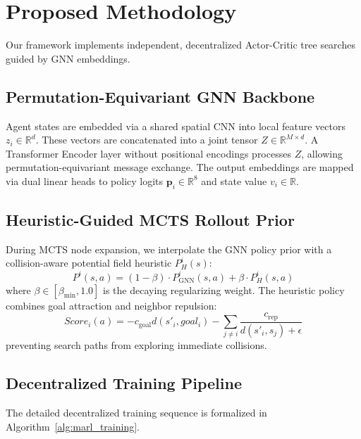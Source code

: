 \documentclass[11pt,a4paper]{article}
\begin{document}
\section{Proposed Methodology}
Our framework implements independent, decentralized Actor-Critic tree searches guided by GNN embeddings.

\subsection{Permutation-Equivariant GNN Backbone}
Agent states are embedded via a shared spatial CNN into local feature vectors $z_i \in \mathbb{R}^{d}$. These vectors are concatenated into a joint tensor $Z \in \mathbb{R}^{M \times d}$. A Transformer Encoder layer without positional encodings processes $Z$, allowing permutation-equivariant message exchange. The output embeddings are mapped via dual linear heads to policy logits $\mathbf{p}_i \in \mathbb{R}^{8}$ and state value $v_i \in \mathbb{R}$.

\subsection{Heuristic-Guided MCTS Rollout Prior}
During MCTS node expansion, we interpolate the GNN policy prior with a collision-aware potential field heuristic $P_H^i(s)$:
\begin{equation}
    P^i(s, a) = (1 - \beta) \cdot P_{\mathrm{GNN}}^i(s, a) + \beta \cdot P_H^i(s, a)
\end{equation}
where $\beta \in [\beta_{\min}, 1.0]$ is the decaying regularizing weight. The heuristic policy combines goal attraction and neighbor repulsion:
\begin{equation}
    Score_i(a) = -c_{\mathrm{goal}} d(s'_i, goal_i) - \sum_{j \neq i} \frac{c_{\mathrm{rep}}}{d(s'_i, s_j) + \epsilon}
\end{equation}
preventing search paths from exploring immediate collisions.

\subsection{Decentralized Training Pipeline}
The detailed decentralized training sequence is formalized in Algorithm~\ref{alg:marl_training}.
\end{document}
